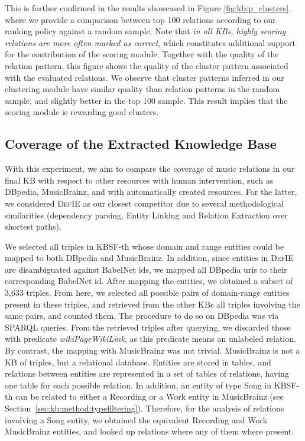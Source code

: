 This is further confirmed in the results showcased in Figure \ref{fig:kb:p_clusters}, where we provide a comparison between top 100 relations according to our ranking policy against a random sample. Note that \textit{in all KBs, highly scoring relations are more often marked as correct}, which constitutes additional support for the contribution of the scoring module. Together with the quality of the relation pattern, this figure shows the quality of the cluster pattern associated with the evaluated relations. We observe that cluster patterns inferred in our clustering module have similar quality than relation patterns in the random sample, and slightly better in the top 100 sample. This result implies that the scoring module is rewarding good clusters.

\subsection{Coverage of the Extracted Knowledge Base}
\label{sec:kb:experiments:coverage}

With this experiment, we aim to compare the coverage of music relations in our final KB with respect to other resources with human intervention, such as DBpedia, MusicBrainz, and with automatically created resources. For the latter, we considered \textsc{DefIE} \citep{DelliBovietal2015b} as our closest competitor due to several methodological similarities (dependency parsing, Entity Linking and Relation Extraction over shortest paths). 

We selected all triples in \textsc{KBSF}-th whose domain and range entities could be mapped to both DBpedia and MusicBrainz. %
In addition, since entities in \textsc{DefIE} are disambiguated against BabelNet ids, we mapped all DBpedia uris to their corresponding BabelNet id. After mapping the entities, we obtained a subset of 3,633 triples. From here, we selected all possible pairs of domain-range entities present in these triples, and retrieved from the other KBs all triples involving the same pairs, and counted them.
The procedure to do so on DBpedia was via SPARQL queries.
From the retrieved triples after querying, we discarded those with predicate \textit{wikiPageWikiLink}, as this predicate means an unlabeled relation. By contrast, the mapping with MusicBrainz was not trivial. MusicBrainz is not a KB of triples, but a relational database. Entities are stored in tables, and relations between entities are represented in a set of tables of relations, having one table for each possible relation. %
In addition, an entity of type Song in \textsc{KBSF}-th can be related to either a Recording or a Work entity in MusicBrainz (see Section~\ref{sec:kb:method:typefiltering}). Therefore, for the analysis of relations involving a Song entity, we obtained the equivalent Recording and Work MusicBrainz entities, and looked up relations where any of them where present.

